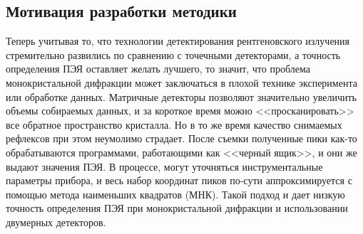 




\subsection{Мотивация разработки методики}

Теперь учитывая то, что технологии детектирования рентгеновского излучения стремительно развились по сравнению с точечными детекторами, а точность определения ПЭЯ оставляет желать лучшего, то значит, что проблема монокристальной дифракции может заключаться в плохой технике эксперимента или обработке данных.
Матричные детекторы позволяют значительно увеличить объемы собираемых данных, и за короткое время можно <<просканировать>> все обратное пространство кристалла.
Но в то же время качество снимаемых рефлексов при этом неумолимо страдает.
После съемки полученные пики как-то обрабатываются программами, работающими как <<черный ящик>>, и они же выдают значения ПЭЯ.
В процессе, могут уточняться инструментальные параметры прибора, и весь набор координат пиков по-сути аппроксимируется с помощью метода наименьших квадратов (МНК).
Такой подход и дает низкую точность определения ПЭЯ при монокристальной дифракции и использовании двумерных детекторов.

